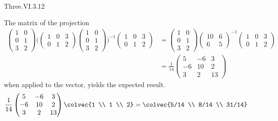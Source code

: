 \begin{ans}{Three.VI.3.12}
\begin{exparts}
        \partsitem The matrix of the projection
          \begin{align*}
            \begin{pmatrix}
              1  &0 \\
              0  &1 \\
              3  &2
            \end{pmatrix}
            \bigl(
              \begin{pmatrix}
                1  &0  &3 \\
                0  &1  &2
              \end{pmatrix}
              \begin{pmatrix}
                1  &0 \\
                0  &1 \\
                3  &2
              \end{pmatrix}
            \bigr)^{-1}
            \begin{pmatrix}
              1  &0  &3 \\
              0  &1  &2
            \end{pmatrix}
            &=
            \begin{pmatrix}
              1  &0 \\
              0  &1 \\
              3  &2
            \end{pmatrix}
              \begin{pmatrix}
                10  &6  \\
                6   &5
              \end{pmatrix}^{-1}
            \begin{pmatrix}
              1  &0  &3 \\
              0  &1  &2
            \end{pmatrix}                                     \\
            &=
            \frac{1}{14}
            \begin{pmatrix}
              5  &-6 &3  \\
             -6  &10 &2  \\
              3  &2  &13
            \end{pmatrix}
          \end{align*}
          when applied to the vector, yields the expected result.
          \begin{equation*}
            \frac{1}{14}
            \begin{pmatrix}
              5  &-6 &3  \\
             -6  &10 &2  \\
              3  &2  &13
            \end{pmatrix}
            \colvec{1 \\ 1 \\ 2}
            =\colvec{5/14 \\ 8/14 \\ 31/14}
          \end{equation*}
      \end{exparts}
    
\end{ans}
